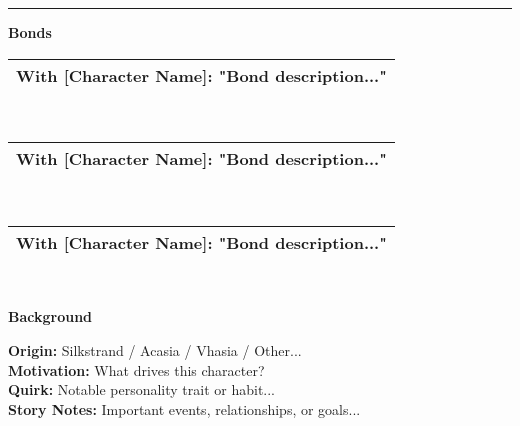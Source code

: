 \documentclass[10pt]{article}
\newcommand{\bondbox}[1]{%
    \begin{tabular}{|>{\raggedright\arraybackslash}m{4.4cm}|}
    \hline
    \cellcolor{bondcolor} \textbf{\small #1} \\
    \hline
    \end{tabular}
}
\begin{document}
\begin{mdframed}[backgroundcolor=background, linewidth=0pt]
\begin{adjustwidth}{0.2cm}{0.2cm}
\rule{\textwidth-0.4cm}{0.4pt}
\end{adjustwidth}

\vspace{0.3cm}

\begin{mdframed}[backgroundcolor=sectionbg, linewidth=1pt, linecolor=accentcolor]
\textbf{\large Bonds}
\end{mdframed}

\begin{center}
\bondbox{With [Character Name]: "Bond description..."} \\
\vspace{0.1cm}
\bondbox{With [Character Name]: "Bond description..."} \\
\vspace{0.1cm}
\bondbox{With [Character Name]: "Bond description..."} \\
\end{center}

\vspace{0.3cm}

\begin{mdframed}[backgroundcolor=sectionbg, linewidth=1pt, linecolor=accentcolor]
\textbf{\large Background}
\end{mdframed}

\begin{adjustwidth}{0.2cm}{0.2cm}
\vspace{0.1cm}
\textbf{Origin:} Silkstrand / Acasia / Vhasia / Other... \\
\textbf{Motivation:} What drives this character? \\
\textbf{Quirk:} Notable personality trait or habit... \\
\vspace{0.2cm}
\textbf{Story Notes:} Important events, relationships, or goals...
\vspace{1cm}
\end{adjustwidth}

\end{mdframed}

\end{document}

